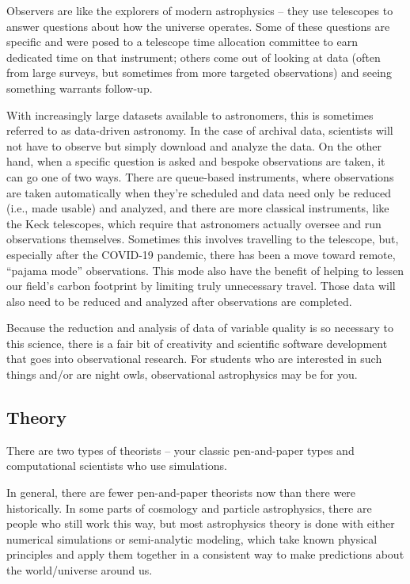 Observers are like the explorers of modern astrophysics -- they use telescopes to answer questions about how the universe operates. Some of these questions are specific and were posed to a telescope time allocation committee to earn dedicated time on that instrument; others come out of looking at data (often from large surveys, but sometimes from more targeted observations) and seeing something warrants follow-up.

With increasingly large datasets available to astronomers, this is sometimes referred to as data-driven astronomy. In the case of archival data, scientists will not have to observe but simply download and analyze the data. On the other hand, when a specific question is asked and bespoke observations are taken, it can go one of two ways. There are queue-based instruments, where observations are taken automatically when they're scheduled and data need only be reduced (i.e., made usable) and analyzed, and there are more classical instruments, like the Keck telescopes, which require that astronomers actually oversee and run observations themselves. Sometimes this involves travelling to the telescope, but, especially after the COVID-19 pandemic, there has been a move toward remote, ``pajama mode'' observations. This mode also have the benefit of helping to lessen our field's carbon footprint by limiting truly unnecessary travel. Those data will also need to be reduced and analyzed after observations are completed.

Because the reduction and analysis of data of variable quality is so necessary to this science, there is a fair bit of creativity and scientific software development that goes into observational research. For students who are interested in such things and/or are night owls, observational astrophysics may be for you.

\subsection{Theory}

There are two types of theorists -- your classic pen-and-paper types and computational scientists who use simulations.

In general, there are fewer pen-and-paper theorists now than there were historically. In some parts of cosmology and particle astrophysics, there are people who still work this way, but most astrophysics theory is done with either numerical simulations or semi-analytic modeling, which take known physical principles and apply them together in a consistent way to make predictions about the world/universe around us. 


